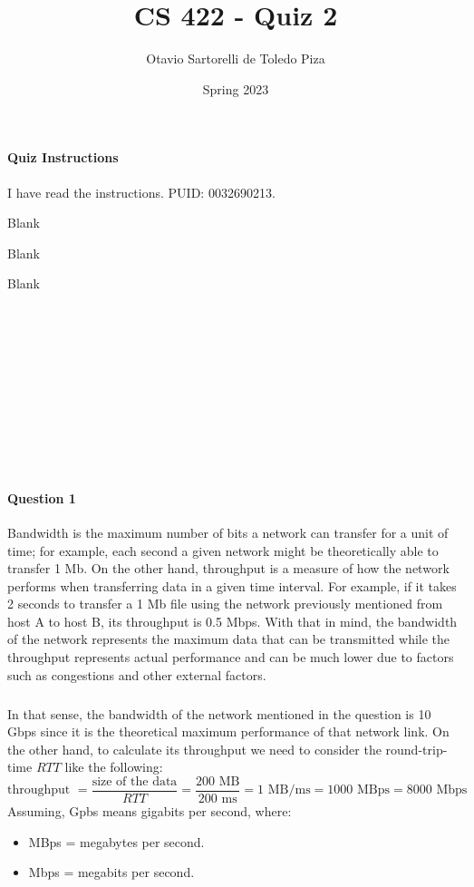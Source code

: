 \documentclass[12pt]{article}
\title{CS 422 - Quiz 2}
\author{Otavio Sartorelli de Toledo Piza}
\date{Spring 2023}
\begin{document}
\maketitle

\pagebreak

\paragraph*{Quiz Instructions}
I have read the instructions. PUID: 0032690213.

\pagebreak
Blank

\pagebreak
Blank

\pagebreak
Blank
\pagebreak

\begin{verbatim}
    











\end{verbatim}

\paragraph*{Question 1}
Bandwidth is the maximum number of bits a network can transfer for a unit of time; for example,
each second a given network might be theoretically able to transfer 1 Mb. On the other hand, 
throughput is a measure of how the network performs when transferring data in a given time 
interval. For example, if it takes 2 seconds to transfer a 1 Mb file using the network previously
mentioned from host A to host B, its throughput is 0.5 Mbps. With that in mind,
the bandwidth of the network represents the maximum data that can be transmitted while the throughput
represents actual performance and can be much lower due to factors such as congestions and other
external factors.

\subparagraph*{}
In that sense, the bandwidth of the network mentioned in the question is 10 Gbps since it is
the theoretical maximum performance of that network link. On the other hand, to calculate
its throughput we need to consider the round-trip-time $RTT$ like the following:
\begin{equation*}
    \text{throughput } = \frac{\text{size of the data}}{RTT} = \frac{200 \text{ MB}}{200 \text{ ms}}
                       = 1 \text{ MB/ms} = 1000 \text{ MBps} = 8000 \text{ Mbps}
\end{equation*}
Assuming, Gpbs means gigabits per second, where:
\begin{itemize}
    \item[] MBps = megabytes per second.
    \item[] Mbps = megabits per second.
\end{itemize}
\end{document}
